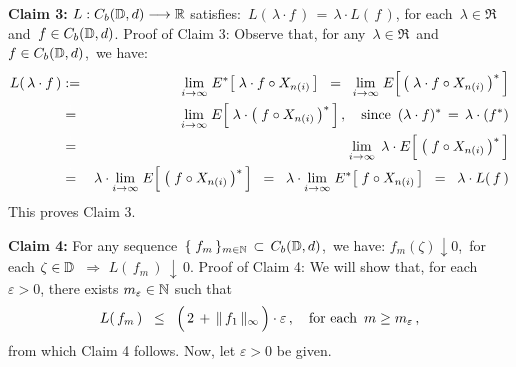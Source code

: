 \vskip 0.5cm
\noindent
\textbf{Claim 3:}\;\;
$L : C_{b}(\mathbb{D},d) \longrightarrow \mathbb{R}$ satisfies:\,
$L(\,\lambda\cdot f\,) \,=\, \lambda \cdot L(\,f\,)$,\;
for each \,$\lambda \in \Re$\, and \,$f \in C_{b}(\mathbb{D},d)$.
\vskip 0.2cm
\noindent
Proof of Claim 3:\;\;
Observe that, for any \,$\lambda \in \Re$\, and \,$f \in C_{b}(\mathbb{D},d)$,\, we have:
\begin{eqnarray*}
L(\,\lambda \cdot f\,)
&:=&
	\underset{i\rightarrow\infty}{\lim}\;
	E^{*}\!\left[\; \lambda \cdot f \circ X_{n(i)} \,\right]
\;\; = \;\;
	\underset{i\rightarrow\infty}{\lim}\;
	E\!\left[\,\left(\; \lambda \cdot f \circ X_{n(i)} \,\right)^{*}\,\right]
\\
& \overset{{\color{white}1}}{=} &
	\underset{i\rightarrow\infty}{\lim}\;
	E\!\left[\; \lambda \cdot \left(\; f \circ X_{n(i)}\,\right)^{*} \,\right],
	\quad
	\textnormal{since \,$(\lambda \cdot f)^{*} \,=\, \lambda \cdot (f^{*})$}
\\
& \overset{{\color{white}1}}{=} &
	\underset{i\rightarrow\infty}{\lim}\;\,
	\lambda \cdot E\!\left[\;\left(\; f \circ X_{n(i)}\,\right)^{*} \,\right]
\\
& \overset{{\color{white}1}}{=} &
	\lambda \cdot
	\underset{i\rightarrow\infty}{\lim}\;
	E\!\left[\;\left(\; f \circ X_{n(i)}\,\right)^{*} \,\right]
\;\; = \;\;
	\lambda \cdot
	\underset{i\rightarrow\infty}{\lim}\;
	E^{*}\!\left[\; f \circ X_{n(i)} \,\right]
\;\; = \;\;
	\lambda \cdot L(\,f\,)
\end{eqnarray*}
This proves Claim 3.

\vskip 0.5cm
\noindent
\textbf{Claim 4:}\;\;
For any sequence \,$\{\;f_{m}\,\}_{m\in\mathbb{N}} \,\subset\, C_{b}(\mathbb{D},d)$,\,
we have:\;
$f_{m}(\zeta) \downarrow 0$,\, for each $\zeta \in \mathbb{D}$
\;\,$\Longrightarrow$\;
$L(\,f_{m}\,) \,\downarrow\, 0$.
\vskip 0.2cm
\noindent
Proof of Claim 4:\;\;
We will show that, for each $\varepsilon > 0$, there exists $m_{\varepsilon} \in \mathbb{N}$ such that
\begin{equation*}
L(\,f_{m}\,)
\;\; \leq \;\;
	\left(\,2 \, \overset{{\color{white}.}}{+} \, \Vert\,f_{1}\,\Vert_{\infty} \,\right) \cdot \varepsilon\,,
\quad
\textnormal{for each \,$m \geq m_{\varepsilon}$}\,,
\end{equation*}
from which Claim 4 follows. Now, let $\varepsilon > 0$ be given.

